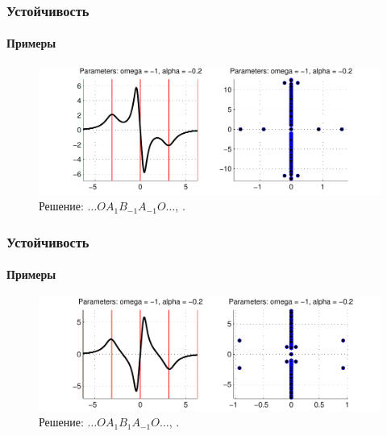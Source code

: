 \documentclass{beamer}
\begin{document}
\begin{frame}
	\frametitle{Устойчивость}
	\framesubtitle{Примеры}
	
	\begin{figure}
		\includegraphics[width=1\textwidth]{pic/example_7.pdf}
		\caption{Решение: $\dots O A_1 B_{-1} A_{-1} O \dots$, {\it \color{fireenginered}{экспоненциально неустойчиво}}.}
		\label{pic:example_7}
	\end{figure}
\end{frame}

\begin{frame}
	\frametitle{Устойчивость}
	\framesubtitle{Примеры}
	
	\begin{figure}
		\includegraphics[width=1\textwidth]{pic/example_8.pdf}
		\caption{Решение: $\dots O A_1 B_1 A_{-1} O \dots$, {\it \color{fireenginered}{осцилляторно неустойчиво}}.}
		\label{pic:example_8}
	\end{figure}
\end{frame}
\end{document}
